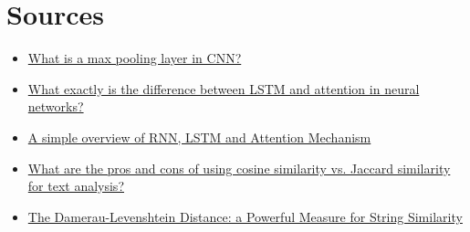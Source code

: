 \documentclass{article}
\begin{document}
\section{Sources}
\begin{itemize}
    \item \href{https://www.educative.io/answers/what-is-a-max-pooling-layer-in-cnn}{What is a max pooling layer in CNN?}
    \item \href{https://www.quora.com/What-exactly-is-the-difference-between-LSTM-and-attention-in-neural-networks#:~:text=In%20summary%2C%20while%20LSTM%20is,performance%20of%20neural%20network%20models.}{What exactly is the difference between LSTM and attention in neural networks?}
    \item \href{https://medium.com/swlh/a-simple-overview-of-rnn-lstm-and-attention-mechanism-9e844763d07b}{A simple overview of RNN, LSTM and Attention Mechanism}
    \item \href{https://www.linkedin.com/advice/3/what-pros-cons-using-cosine-similarity-vs}{What are the pros and cons of using cosine similarity vs. Jaccard similarity for text analysis?}
    \item \href{https://medium.com/@evertongomede/the-damerau-levenshtein-distance-a-powerful-measure-for-string-similarity-22dc4b150f0a}{The Damerau-Levenshtein Distance: a Powerful Measure for String Similarity}
\end{itemize}
\end{document}
